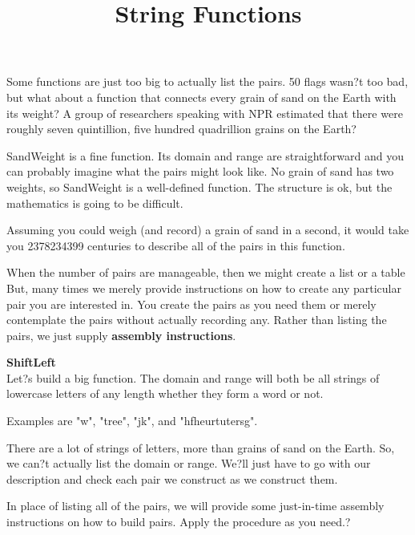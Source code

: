 \documentclass{ximera}
\title{String Functions}
\begin{document}
\begin{abstract}
\end{abstract}

\maketitle






Some functions are just too big to actually list the pairs. 50 flags wasn?t too bad, but what about a function that connects every grain of sand on the Earth with its weight? A group of researchers speaking with NPR estimated that there were roughly seven quintillion, five hundred quadrillion grains on the Earth?

SandWeight is a fine function.  Its domain and range are straightforward and you can probably imagine what the pairs might look like.  No grain of sand has two weights, so SandWeight is a well-defined function.  The structure is ok, but the mathematics is going to be difficult.  

Assuming you could weigh (and record) a grain of sand in a second, it would take you 2378234399 centuries to describe all of the pairs in this function.  

When the number of pairs are manageable, then we might create a list or a table  But, many times we merely provide instructions on how to create any particular pair you are interested in. You create the pairs as you need them or merely contemplate the pairs without actually recording any. Rather than listing the pairs, we just supply \textbf{assembly instructions}.

\textbf{ShiftLeft}  \\
Let?s build a big function.  The domain and range will both be all strings of lowercase letters of any length whether they form a word or not.

Examples are "w", "tree", "jk", and "hfheurtutersg". 

There are a lot of strings of letters, more than grains of sand on the Earth. So, we can?t actually list the domain or range. We?ll just have to go with our description and check each pair we construct as we construct them. 

In place of listing all of the pairs, we will provide some just-in-time assembly instructions on how to build pairs. Apply the procedure as you need.?
\end{document}
